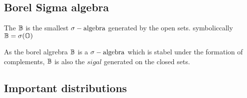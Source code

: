 \subsection{Borel Sigma algebra} %
\label{sub:borel_sigma_algebra}
\begin{defn}
  The   \({\mathbb{B}}\) is the smallest \(\sigma-\text{algebra}\) generated by the open sets. symboliccally \({\mathbb{B}}=\sigma({\mathbb{O}})\)
\end{defn}
\begin{rem}
  As the borel algrebra \({\mathbb{B}}\) is a \(\sigma-\text{algebra}\) which is stabel under the formation of complements, \({\mathbb{B}}\) is also the \(sigal\) generated on the closed sets.
\end{rem}
\subsection{Important distributions} %
\label{sub:important_distrLJibutions}
